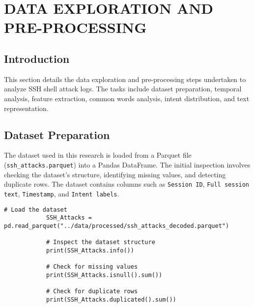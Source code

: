 

\section{DATA EXPLORATION AND PRE-PROCESSING}


    \subsection{Introduction}

        This section details the data exploration and pre-processing steps undertaken to analyze SSH shell attack logs. The tasks include dataset preparation, temporal analysis, feature extraction, common words analysis, intent distribution, and text representation.

    \subsection{Dataset Preparation}
    
        The dataset used in this research is loaded from a Parquet file (\texttt{ssh\_attacks.parquet}) into a Pandas DataFrame. The initial inspection involves checking the dataset's structure, identifying missing values, and detecting duplicate rows. The dataset contains columns such as \texttt{Session ID}, \texttt{Full session text}, \texttt{Timestamp}, and \texttt{Intent labels}.
        
        \vspace{0.5em}

        \begin{lstlisting}[caption={Load and inspect the dataset}, label={lst:load-inspect-dataset}]
            # Load the dataset
            SSH_Attacks = pd.read_parquet("../data/processed/ssh_attacks_decoded.parquet")
    
            # Inspect the dataset structure
            print(SSH_Attacks.info())
    
            # Check for missing values
            print(SSH_Attacks.isnull().sum())
    
            # Check for duplicate rows
            print(SSH_Attacks.duplicated().sum())
        \end{lstlisting}

